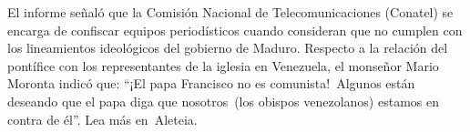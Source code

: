 \documentclass{article}%
\begin{document}
\newline%
%
El informe señaló que la Comisión Nacional de Telecomunicaciones (Conatel) se encarga de confiscar equipos periodísticos cuando consideran que no cumplen con los lineamientos ideológicos del gobierno de Maduro.%
\newline%
%
Respecto a la relación del pontífice con los representantes de la iglesia en Venezuela, el monseñor Mario Moronta indicó que: “¡El papa Francisco no es comunista!~Algunos están deseando que el papa diga que nosotros~(los obispos venezolanos) estamos en contra de él”.%
\newline%
%
Lea más en~Aleteia.%
\newline%
%
\end{document}
